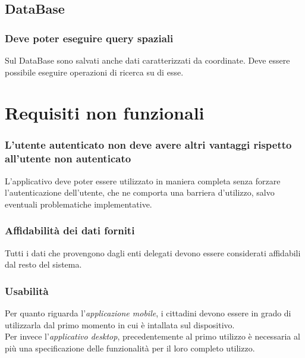 \documentclass{article}
\begin{document}
\subsection{DataBase}

\subsubsection{Deve poter eseguire query spaziali}
\label{5.7.1}
Sul DataBase sono salvati anche dati caratterizzati da coordinate. Deve essere possibile eseguire operazioni di ricerca su di esse.

\clearpage

\section{Requisiti non funzionali}

\subsubsection{L'utente autenticato non deve avere altri vantaggi rispetto all'utente non autenticato}
L'applicativo deve poter essere utilizzato in maniera completa senza forzare l'autenticazione dell'utente, che ne comporta una barriera d'utilizzo, salvo eventuali problematiche implementative.

\subsubsection{Affidabilità dei dati forniti}
Tutti i dati che provengono dagli enti delegati devono essere considerati affidabili dal resto del sistema.

\subsubsection{Usabilità}
Per quanto riguarda l'\textit{applicazione mobile}, i cittadini devono essere in grado di utilizzarla dal primo momento in cui è intallata sul dispositivo.\\
Per invece l'\textit{applicativo desktop}, precedentemente al primo utilizzo è necessaria al più una specificazione delle funzionalità per il loro completo utilizzo.
\end{document}
